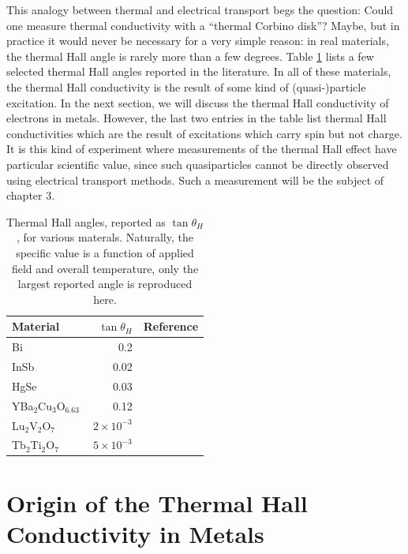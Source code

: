 \documentclass{thesis-umich}
\begin{document}
This analogy between thermal and electrical transport begs the question: Could
one measure thermal conductivity with a ``thermal Corbino disk''? Maybe, but in
practice it would never be necessary for a very simple reason: in real
materials, the thermal Hall angle is rarely more than a few degrees. Table
\ref{tab:hall_angles} lists a few selected thermal Hall angles reported in the
literature. In all of these materials, the thermal Hall conductivity is the
result of some kind of (quasi-)particle excitation. In the next section, we
will discuss the thermal Hall conductivity of electrons in metals. However, the
last two entries in the table list thermal Hall conductivities which are the
result of excitations which carry spin but not charge. It is this kind of
experiment where measurements of the thermal Hall effect have particular
scientific value, since such quasiparticles cannot be directly observed using
electrical transport methods. Such a measurement will be the subject of chapter
3.

\begin{table}
\centering
\label{tab:hall_angles}
\begin{tabular}{l|r|c}
\hline
Material & $\tan \theta_H$ & Reference \\
\hline
Bi & 0.2 & \cite{Kobayashi2012}  \\
InSb & 0.02 & \cite{Mette1963} \\
HgSe & 0.03 & \cite{Whitsett1961} \\
YBa$_2$Cu$_3$O$_{6.63}$ & 0.12 & \cite{Krishana1999} \\
Lu$_2$V$_2$O$_7$ & $2 \times 10^{-3}$ & \cite{Onose2010} \\
Tb$_2$Ti$_2$O$_7$ & $~5 \times 10^{-3}$ & \cite{Hirschberger2015} \\
\hline
\end{tabular}
\caption[Example thermal Hall angles]{Thermal Hall angles, reported as $\tan \theta_H$, for various materals. Naturally, the specific value is a function of applied field and overall temperature, only the largest reported angle is reproduced here.}
\end{table}
\section{Origin of the Thermal Hall Conductivity in Metals}
\end{document}
